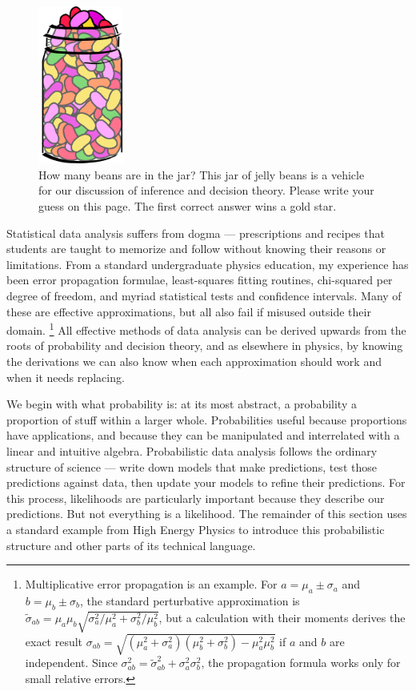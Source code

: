 \begin{figure}[tp]
\centering
\includegraphics[width=0.25\textwidth]{figures/searches_beans.pdf}
\caption[
How many beans are in the jar?
]{%
How many beans are in the jar? This jar of jelly beans is a vehicle for our
discussion of inference and decision theory.
Please write your guess on this page.
The first correct answer wins a gold star.
}
\label{fig:searches_beans}
\end{figure}

Statistical data analysis suffers from dogma --- prescriptions and recipes that
students are taught to memorize and follow without knowing their reasons or
limitations.
From a standard undergraduate physics education, my experience has been
error propagation formulae,
least-squares fitting routines,
chi-squared per degree of freedom,
and myriad statistical tests and confidence intervals.
Many of these are effective approximations, but all also fail if misused
outside their domain.%
\footnote{%
Multiplicative error propagation is an example.
For $a = \mu_a \pm \sigma_a$ and $b = \mu_b \pm \sigma_b$,
the standard perturbative approximation is
\(
\widetilde{\sigma}_{ab}
= \mu_a \mu_b \sqrt{\sigma_a^2/\mu_a^2 + \sigma_b^2/\mu_b^2}
\),
but a calculation with their moments derives the exact result
\(
\sigma_{ab}
= \sqrt{(\mu_a^2 + \sigma_a^2)(\mu_b^2 + \sigma_b^2) - \mu_a^2\mu_b^2}
\)
if $a$ and $b$ are independent.
Since $\sigma_{ab}^2 = \widetilde{\sigma}_{ab}^2 + \sigma_a^2 \sigma_b^2$, the
propagation formula works only for small relative errors.
}
All effective methods of data analysis can be derived upwards from the roots of
probability and decision theory, and as elsewhere in physics, by knowing the
derivations we can also know when each approximation should work and when it
needs replacing.

We begin with what probability is: at its most abstract, a probability a
proportion of stuff within a larger whole.
Probabilities useful because proportions have applications, and because they
can be manipulated and interrelated with a linear and intuitive algebra.
Probabilistic data analysis follows the ordinary structure of science ---
write down models that make predictions, test those predictions against data,
then update your models to refine their predictions.
For this process, likelihoods are particularly important because they describe
our predictions. But not everything is a likelihood.
The remainder of this section uses a standard example from High Energy Physics
to introduce this probabilistic structure and other parts of its technical
language.

